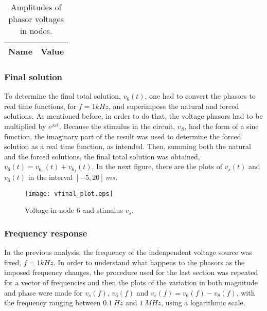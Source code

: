 



\begin{table}[H]
  \centering
  \begin{tabular}{|c|c|}
    \hline    
    {\bf Name} & {\bf Value} \\ \hline
    
  \end{tabular}
  \caption{Amplitudes of phasor voltages in nodes.}
  \label{tab:forced_amp}
\end{table}


\subsubsection{Final solution}  %
To determine the final total solution, $v_6(t)$, one had to convert the phasors to real time functions, for $f=1kHz$, and superimpose the natural and forced solutions.
As mentioned before, in order to do that, the voltage phasors had to be multiplied by $e^{j \omega t}$. Because the stimulus in the circuit, $v_S$, had the form of a sine function, the imaginary part of the result was used to determine the forced solution as a real time function, as intended.
Then, summing both the natural and the forced solutions, the final total solution was obtained, $v_6(t) = v_{6_n} (t) + v_{6_f} (t)$.
In the next figure, there are the plots of $v_s(t)$ and $v_6(t)$ in the interval $[-5, 20] \ ms$.


\begin{figure}[H] \centering
\texttt{[image: vfinal\_plot.eps]}
\caption{Voltage in node 6 and stimulus $v_s$.}
\label{fig:final}
\end{figure}



\subsubsection{Frequency response}  %
In the previous analysis, the frequency of the indenpendent voltage source was fixed, $f=1kHz$. In order to understand what happens to the phasors as the imposed frequency changes, the procedure used for the last section was repeated for a vector of frequencies and then the plots of the variation in both magnitude and phase were made for $v_s(f)$, $v_6(f)$ and $v_c(f) = v_6(f)-v_8(f)$, with the frequency ranging between $0.1 \ Hz$ and $1 \ MHz$, using a logarithmic scale.


